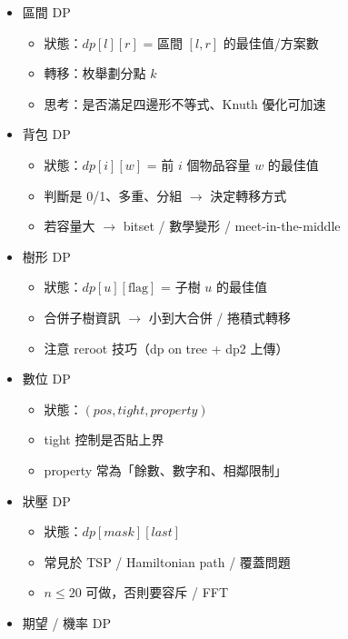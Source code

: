 \documentclass[a4paper,10pt,twocolumn,oneside]{article}
\begin{document}
\begin{itemize}[nolistsep]
    \item 區間 DP  
        \begin{itemize}[nolistsep]
            \item 狀態：$dp[l][r]$ = 區間 $[l,r]$ 的最佳值/方案數  
            \item 轉移：枚舉劃分點 $k$  
            \item 思考：是否滿足四邊形不等式、Knuth 優化可加速  
        \end{itemize}
    \item 背包 DP  
        \begin{itemize}[nolistsep]
            \item 狀態：$dp[i][w]$ = 前 $i$ 個物品容量 $w$ 的最佳值  
            \item 判斷是 0/1、多重、分組 $\rightarrow$ 決定轉移方式  
            \item 若容量大 $\rightarrow$ bitset / 數學變形 / meet-in-the-middle  
        \end{itemize}
    \item 樹形 DP  
        \begin{itemize}[nolistsep]
            \item 狀態：$dp[u][\text{flag}]$ = 子樹 $u$ 的最佳值  
            \item 合併子樹資訊 $\rightarrow$ 小到大合併 / 捲積式轉移  
            \item 注意 reroot 技巧（dp on tree + dp2 上傳）  
        \end{itemize}
    \item 數位 DP  
        \begin{itemize}[nolistsep]
            \item 狀態：$(pos, tight, property)$  
            \item tight 控制是否貼上界  
            \item property 常為「餘數、數字和、相鄰限制」  
        \end{itemize}
    \item 狀壓 DP  
        \begin{itemize}[nolistsep]
            \item 狀態：$dp[mask][last]$  
            \item 常見於 TSP / Hamiltonian path / 覆蓋問題  
            \item $n \le 20$ 可做，否則要容斥 / FFT  
        \end{itemize}
    \item 期望 / 機率 DP  

\end{itemize}
\end{document}
